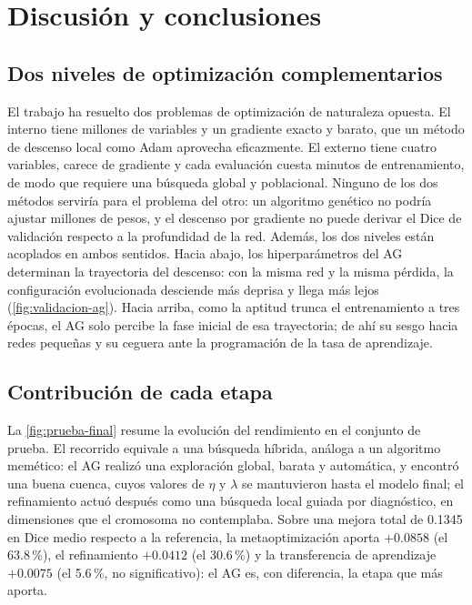 \section{Discusión y conclusiones}\label{sec:discusion}

\subsection{Dos niveles de optimización complementarios}\label{subsec:dos-niveles}

El trabajo ha resuelto dos problemas de optimización de naturaleza opuesta. El interno tiene millones de variables y un gradiente exacto y barato, que un método de descenso local como Adam aprovecha eficazmente. El externo tiene cuatro variables, carece de gradiente y cada evaluación cuesta minutos de entrenamiento, de modo que requiere una búsqueda global y poblacional. Ninguno de los dos métodos serviría para el problema del otro: un algoritmo genético no podría ajustar millones de pesos, y el descenso por gradiente no puede derivar el Dice de validación respecto a la profundidad de la red. Además, los dos niveles están acoplados en ambos sentidos. Hacia abajo, los hiperparámetros del AG determinan la trayectoria del descenso: con la misma red y la misma pérdida, la configuración evolucionada desciende más deprisa y llega más lejos (\cref{fig:validacion-ag}). Hacia arriba, como la aptitud trunca el entrenamiento a tres épocas, el AG solo percibe la fase inicial de esa trayectoria; de ahí su sesgo hacia redes pequeñas y su ceguera ante la programación de la tasa de aprendizaje.

\subsection{Contribución de cada etapa}\label{subsec:contribucion}

La \cref{fig:prueba-final} resume la evolución del rendimiento en el conjunto de prueba. El recorrido equivale a una búsqueda híbrida, análoga a un algoritmo memético: el AG realizó una exploración global, barata y automática, y encontró una buena cuenca, cuyos valores de $\eta$ y $\lambda$ se mantuvieron hasta el modelo final; el refinamiento actuó después como una búsqueda local guiada por diagnóstico, en dimensiones que el cromosoma no contemplaba. Sobre una mejora total de 0.1345 en Dice medio respecto a la referencia, la metaoptimización aporta $+0.0858$ (el 63.8\,\%), el refinamiento $+0.0412$ (el 30.6\,\%) y la transferencia de aprendizaje $+0.0075$ (el 5.6\,\%, no significativo): el AG es, con diferencia, la etapa que más aporta.

